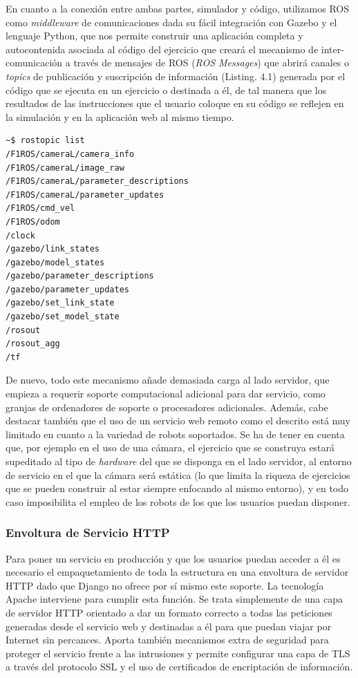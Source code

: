 En cuanto a la conexión entre ambas partes, simulador y código, utilizamos ROS como \textit{middleware} de comunicaciones dada su fácil integración con Gazebo y el lenguaje Python, que nos permite construir una aplicación completa y autocontenida asociada al código del ejercicio que creará el mecanismo de inter-comunicación a través de mensajes de ROS (\textit{ROS Messages}) que abrirá canales o \textit{topics} de publicación y suscripción de información (Listing. 4.1) generada por el código que se ejecuta en un ejercicio o destinada a él, de tal manera que los resultados de las instrucciones que el usuario coloque en su código se reflejen en la simulación y en la aplicación web al mismo tiempo.

\begin{lstlisting}[language=bash, caption=Topics de ROS asociados a los Canales de Comunicación Internos]
~$ rostopic list
/F1ROS/cameraL/camera_info
/F1ROS/cameraL/image_raw
/F1ROS/cameraL/parameter_descriptions
/F1ROS/cameraL/parameter_updates
/F1ROS/cmd_vel
/F1ROS/odom
/clock
/gazebo/link_states
/gazebo/model_states
/gazebo/parameter_descriptions
/gazebo/parameter_updates
/gazebo/set_link_state
/gazebo/set_model_state
/rosout
/rosout_agg
/tf
\end{lstlisting}

De nuevo, todo este mecanismo añade demasiada carga al lado servidor, que empieza a requerir soporte computacional adicional para dar servicio, como granjas de ordenadores de soporte o procesadores adicionales. Además, cabe destacar también que el uso de un servicio web remoto como el descrito está muy limitado en cuanto a la variedad de robots soportados. Se ha de tener en cuenta que, por ejemplo en el uso de una cámara, el ejercicio que se construya estará supeditado al tipo de \textit{hardware} del que se disponga en el lado servidor, al entorno de servicio en el que la cámara será estática (lo que limita la riqueza de ejercicios que se pueden construir al estar siempre enfocando al mismo entorno), y en todo caso imposibilita el empleo de los robots de los que los usuarios puedan disponer.

\subsubsection{Envoltura de Servicio HTTP}

Para poner un servicio en producción y que los usuarios puedan acceder a él es necesario el empaquetamiento de toda la estructura en una envoltura de servidor HTTP dado que Django no ofrece por sí mismo este soporte. La tecnología Apache interviene para cumplir esta función. Se trata simplemente de una capa de servidor HTTP orientado a dar un formato correcto a todas las peticiones generadas desde el servicio web y destinadas a él para que puedan viajar por Internet sin percances. Aporta también mecanismos extra de seguridad para proteger el servicio frente a las intrusiones y permite configurar una capa de TLS a través del protocolo SSL y el uso de certificados de encriptación de información.

